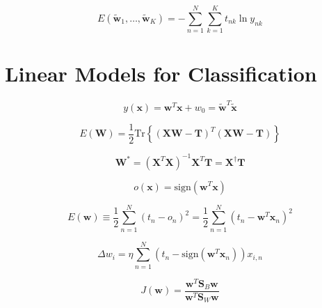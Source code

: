 \documentclass{article}
\begin{document}
\begin{equation}
    E(\tilde{\mathbf{w}}_1, \dots, \tilde{\mathbf{w}}_K) = - \sum_{n=1}^N \sum_{k=1}^K t_{nk} \ln y_{nk}
\end{equation}


\section{Linear Models for Classification}

\begin{equation}
    y(\mathbf{x}) = \mathbf{w}^T \mathbf{x} + w_0 = \tilde{\mathbf{w}}^T \tilde{\mathbf{x}}
\end{equation}

\begin{equation}
    E(\mathbf{W}) = \frac{1}{2} \text{Tr} \left\{ (\mathbf{X}\mathbf{W} - \mathbf{T})^T (\mathbf{X}\mathbf{W} - \mathbf{T}) \right\}
\end{equation}

\begin{equation}
    \mathbf{W}^* = (\mathbf{X}^T \mathbf{X})^{-1} \mathbf{X}^T \mathbf{T} = \mathbf{X}^{\dagger} \mathbf{T}
\end{equation}

\begin{equation}
    o(\mathbf{x}) = \text{sign}(\mathbf{w}^T \mathbf{x})
\end{equation}

\begin{equation}
    E(\mathbf{w}) \equiv \frac{1}{2} \sum_{n=1}^N (t_n - o_n)^2 = \frac{1}{2} \sum_{n=1}^N (t_n - \mathbf{w}^T \mathbf{x}_n)^2
\end{equation}

\begin{equation}
    \Delta w_i = \eta \sum_{n=1}^N (t_n - \text{sign}(\mathbf{w}^T \mathbf{x}_n)) x_{i,n}
\end{equation}

\begin{equation}
    J(\mathbf{w}) = \frac{\mathbf{w}^T \mathbf{S}_B \mathbf{w}}{\mathbf{w}^T \mathbf{S}_W \mathbf{w}}
\end{equation}
\end{document}
